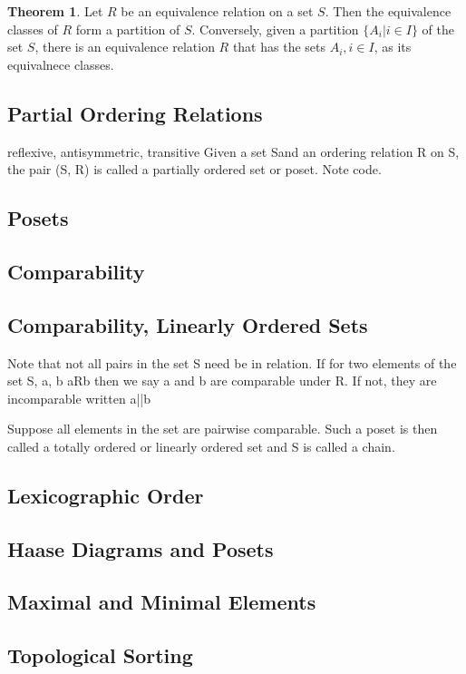 \documentclass[11pt]{book} %
\theoremstyle {definition}
\newtheorem {theorem}{Theorem}[section]
\theoremstyle {remark}
\begin{document}
\begin{theorem}
Let $R$ be an equivalence relation on a set $S$. Then the equivalence classes of $R$ form a partition of $S$. Conversely, given a partition $\{A_i | i \in I\}$ of the set $S$, there is an equivalence relation $R$ that has the sets $A_i, i \in I$, as its equivalnece classes.
\end{theorem}

    \subsection {Partial Ordering Relations}
reflexive, antisymmetric, transitive
Given a set Sand an ordering relation R on S,  the pair (S, R) is called a partially ordered set or poset. Note code.

    \subsection {Posets}
    \subsection {Comparability}
    \subsection {Comparability, Linearly Ordered Sets}
Note that not all pairs in the set S need be in relation. If for two elements of the set S, a, b aRb then we say a and b are comparable under R. If not, they are incomparable written a||b

Suppose all elements in the set are pairwise comparable. Such a poset is then called a totally ordered or linearly ordered set and S is called a chain. 

    \subsection {Lexicographic Order}
    \subsection {Haase Diagrams and Posets}
    \subsection {Maximal and Minimal Elements}
    \subsection {Topological Sorting}
    
\end{document}
